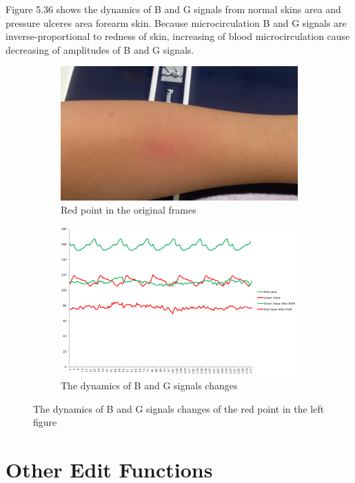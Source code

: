 Figure 5.36 shows the dynamics of B and G signals from normal skins area and pressure ulceres area forearm
skin. Because microcirculation B and G signals are inverse-proportional to redness of skin, increasing of blood microcirculation cause decreasing of amplitudes of B and G signals. 
 \begin{figure}[!h]
\centering
\begin{subfigure}{.5\textwidth}
  \centering
  \includegraphics[scale=0.25]{img/noisepos}
  \caption{Red point in the original frames}
  \label{fig:sub1}
\end{subfigure}%
\begin{subfigure}{.5\textwidth}
  \centering
  \includegraphics[scale=0.25]{img/change}
  \caption{The dynamics of B and G signals changes}
  \label{fig:sub2}
\end{subfigure}
\caption{The dynamics of B and G signals changes of the red point in the left figure}
\label{fig:test}
\end{figure}

\newpage
\section{Other Edit Functions}
